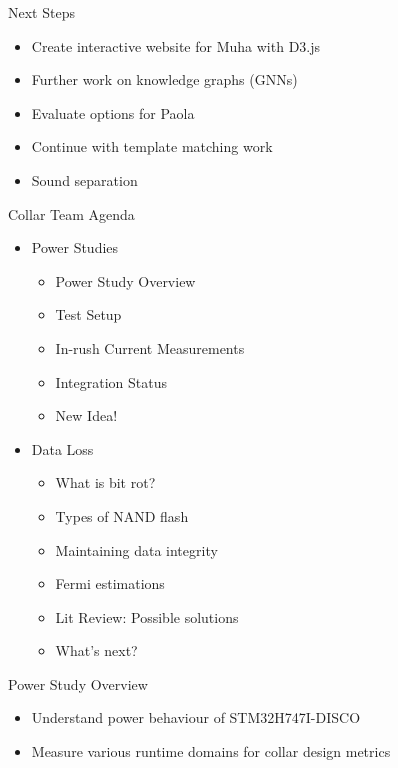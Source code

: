 \begin{frame}{Next Steps}
    \begin{itemize}
        \item Create interactive website for Muha with D3.js
        \item Further work on knowledge graphs (GNNs)
        \item Evaluate options for Paola
        \item Continue with template matching work
        \item Sound separation
    \end{itemize}
\end{frame}

\begin{frame}{Collar Team Agenda}
    \begin{itemize}
        \item Power Studies
        \begin{itemize}
            \item Power Study Overview
            \item Test Setup 
            \item In-rush Current Measurements
            \item Integration Status
            \item New Idea!
        \end{itemize}
        \item Data Loss
        \begin{itemize}
            \item What is bit rot?
            \item Types of NAND flash
            \item Maintaining data integrity
            \item Fermi estimations
            \item Lit Review: Possible solutions
            \item What's next?
        \end{itemize}
    \end{itemize}
\end{frame}

\begin{frame}{Power Study Overview}
    \begin{itemize}
        \item Understand power behaviour of STM32H747I-DISCO
        \item Measure various runtime domains for collar design metrics
    \end{itemize}
\end{frame}

